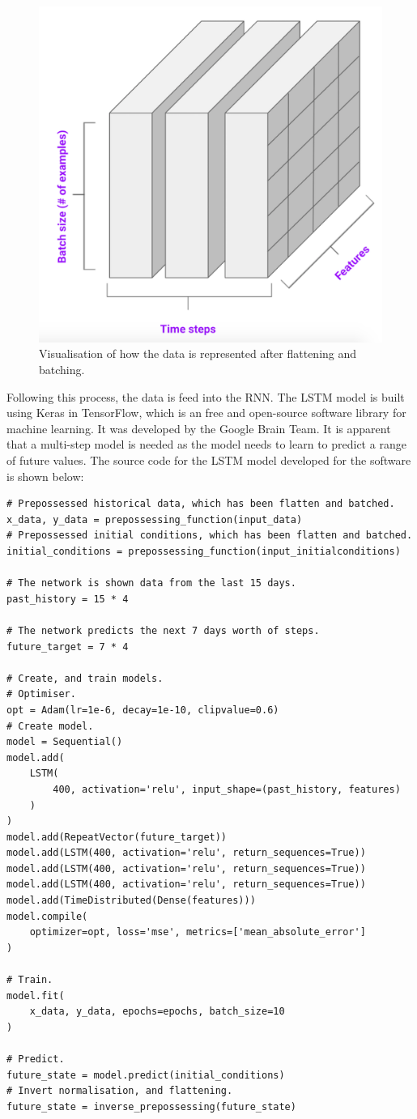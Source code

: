\begin{figure}[H]
    \centering
    \includegraphics[width=.5\linewidth]{Images/data_rnn.png}
    \caption{Visualisation of how the data is represented after flattening and batching.}
\end{figure}

Following this process, the data is feed into the RNN. The LSTM model is built using Keras in TensorFlow, which is an free and open-source software library for machine learning. It was developed by the Google Brain Team\cite{tensorflow}. It is apparent that a multi-step model is needed as the model needs to learn to predict a range of future values. The source code for the LSTM model developed for the software is shown below:

\begin{verbatim}
# Prepossessed historical data, which has been flatten and batched.
x_data, y_data = prepossessing_function(input_data)
# Prepossessed initial conditions, which has been flatten and batched.
initial_conditions = prepossessing_function(input_initialconditions)

# The network is shown data from the last 15 days.
past_history = 15 * 4

# The network predicts the next 7 days worth of steps.
future_target = 7 * 4

# Create, and train models.
# Optimiser.
opt = Adam(lr=1e-6, decay=1e-10, clipvalue=0.6)
# Create model.
model = Sequential()
model.add(
    LSTM(
        400, activation='relu', input_shape=(past_history, features)
    )
)
model.add(RepeatVector(future_target))
model.add(LSTM(400, activation='relu', return_sequences=True))
model.add(LSTM(400, activation='relu', return_sequences=True))
model.add(LSTM(400, activation='relu', return_sequences=True))
model.add(TimeDistributed(Dense(features)))
model.compile(
    optimizer=opt, loss='mse', metrics=['mean_absolute_error']
)

# Train.
model.fit(
    x_data, y_data, epochs=epochs, batch_size=10
)

# Predict.
future_state = model.predict(initial_conditions)
# Invert normalisation, and flattening.
future_state = inverse_prepossessing(future_state)
\end{verbatim}

